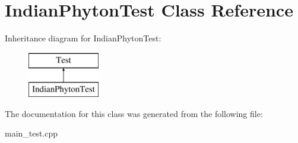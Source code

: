 \hypertarget{class_indian_phyton_test}{}\section{Indian\+Phyton\+Test Class Reference}
\label{class_indian_phyton_test}
Inheritance diagram for Indian\+Phyton\+Test\+:\begin{figure}[H]
\begin{center}
\leavevmode
\includegraphics[height=2.000000cm]{class_indian_phyton_test}
\end{center}
\end{figure}


The documentation for this class was generated from the following file\+:\begin{DoxyCompactItemize}
\item 
main\+\_\+test.\+cpp\end{DoxyCompactItemize}
